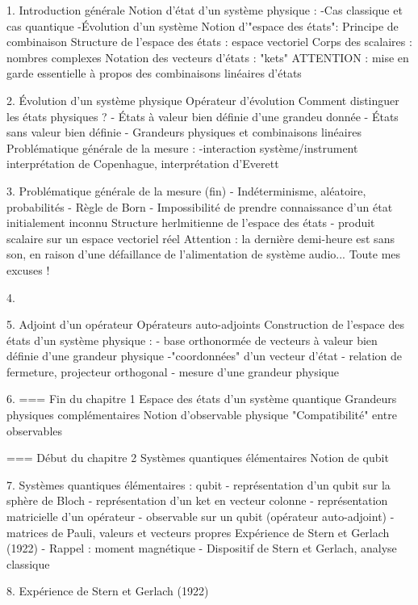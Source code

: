 1.
Introduction générale
Notion d'état d'un système physique :
-Cas classique et cas quantique
-Évolution d'un système
Notion d'"espace des états":
Principe de combinaison
Structure de l'espace des états : espace vectoriel
Corps des scalaires : nombres complexes
Notation des vecteurs d'états : "kets"
ATTENTION : mise en garde essentielle à propos des combinaisons linéaires d'états

2.
Évolution d'un système physique
Opérateur d'évolution
Comment distinguer les états physiques ?
- États à valeur bien définie d'une grandeu donnée
- États sans valeur bien définie
- Grandeurs physiques et combinaisons linéaires
Problématique générale de la mesure :
-interaction système/instrument
interprétation de Copenhague, interprétation d'Everett

3.
Problématique générale de la mesure (fin)
- Indéterminisme, aléatoire, probabilités
- Règle de Born
- Impossibilité de prendre connaissance d'un état initialement inconnu
Structure herlmitienne de l'espace des états
- produit scalaire sur un espace vectoriel réel
Attention : la dernière demi-heure est sans son, en raison d'une défaillance de l'alimentation de système audio... Toute mes excuses !

4.

5.
Adjoint d'un opérateur
Opérateurs auto-adjoints
Construction de l'espace des états d'un système physique :
- base orthonormée de vecteurs à valeur bien définie d'une grandeur physique
-"coordonnées" d'un vecteur d'état
- relation de fermeture, projecteur orthogonal
- mesure d'une grandeur physique

6.
=== Fin du chapitre 1
Espace des états d'un système quantique
Grandeurs physiques complémentaires
Notion d'observable physique
"Compatibilité" entre observables

=== Début du chapitre 2
Systèmes quantiques élémentaires
Notion de qubit

7.
Systèmes quantiques élémentaires : qubit
- représentation d'un qubit sur la sphère de Bloch
- représentation d'un ket en vecteur colonne
- représentation matricielle d'un opérateur
- observable sur un qubit (opérateur auto-adjoint)
- matrices de Pauli, valeurs et vecteurs propres
Expérience de Stern et Gerlach (1922)
- Rappel : moment magnétique
- Dispositif de Stern et Gerlach, analyse classique

8.
Expérience de Stern et Gerlach (1922)
